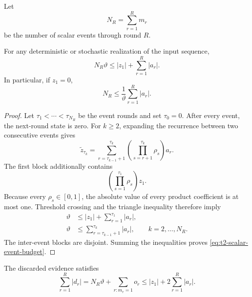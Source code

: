 Let
\begin{equation}
    N_R=\sum_{r=1}^{R}m_r
\end{equation}
be the number of scalar events through round $R$.

\begin{proposition}
\label{prop:t2-scalar-event-budget}
For any deterministic or stochastic realization of the input sequence,
\begin{equation}
    N_R\vartheta
    \leq
    |z_1|+\sum_{r=1}^{R}|a_r|.
    \label{eq:t2-scalar-event-budget}
\end{equation}
In particular, if $z_1=0$,
\begin{equation}
    N_R
    \leq
    \frac{1}{\vartheta}
    \sum_{r=1}^{R}|a_r|.
    \label{eq:t2-scalar-event-budget-zero}
\end{equation}
\end{proposition}

\begin{proof}
Let $\tau_1<\cdots<\tau_{N_R}$ be the event rounds and set $\tau_0=0$. After every event, the next-round state is zero. For $k\geq2$, expanding the recurrence between two consecutive events gives
\begin{equation}
    \widetilde z_{\tau_k}
    =
    \sum_{r=\tau_{k-1}+1}^{\tau_k}
    \left(
        \prod_{s=r+1}^{\tau_k}\rho_s
    \right)a_r.
    \label{eq:t2-event-block}
\end{equation}
The first block additionally contains
\begin{equation}
    \left(\prod_{s=1}^{\tau_1}\rho_s\right)z_1.
\end{equation}
Because every $\rho_s\in[0,1]$, the absolute value of every product coefficient is at most one. Threshold crossing and the triangle inequality therefore imply
\begin{align}
    \vartheta
    &\leq
    |z_1|+\sum_{r=1}^{\tau_1}|a_r|,
    \\
    \vartheta
    &\leq
    \sum_{r=\tau_{k-1}+1}^{\tau_k}|a_r|,
    \qquad k=2,\ldots,N_R.
\end{align}
The inter-event blocks are disjoint. Summing the inequalities proves \eqref{eq:t2-scalar-event-budget}.
\end{proof}

\begin{corollary}
\label{cor:t2-total-discarded}
The discarded evidence satisfies
\begin{equation}
    \sum_{r=1}^{R}|d_r|
    =
    N_R\vartheta+\sum_{r:m_r=1}o_r
    \leq
    |z_1|+2\sum_{r=1}^{R}|a_r|.
    \label{eq:t2-total-discarded}
\end{equation}
\end{corollary}

